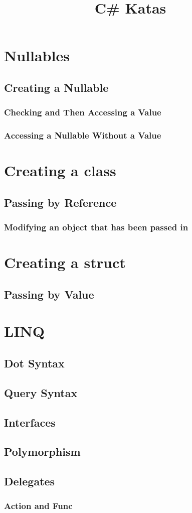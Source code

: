 \documentclass {amsart}
\title{C\# Katas}
\begin{document}
\maketitle

\section{Nullables}
	\subsection{Creating a Nullable}
		\subsubsection{Checking and Then Accessing a Value}
		\subsubsection{Accessing a Nullable Without a Value}
\section{Creating a class}
	\subsection{Passing by Reference}
		\subsubsection{Modifying an object that has been passed in}
\section{Creating a struct}
	\subsection{Passing by Value}
\section{LINQ}
	\subsection{Dot Syntax}
	\subsection{Query Syntax}

\subsection{Interfaces}
\subsection{Polymorphism}
\subsection{Delegates}
	\subsubsection{Action and Func}
\end{document}
